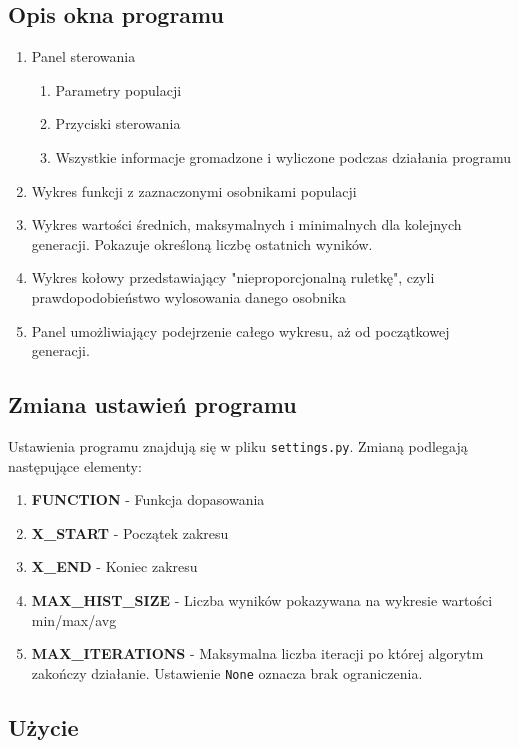 \documentclass[a4paper,11pt]{article}
\begin{document}
		\subsection{Opis okna programu}
			\begin{enumerate}
				\item Panel sterowania
				\begin{enumerate}
					\item Parametry populacji
					\item Przyciski sterowania
					\item Wszystkie informacje gromadzone i wyliczone podczas działania programu
				\end{enumerate}
				\item Wykres funkcji z zaznaczonymi osobnikami populacji
				\item Wykres wartości średnich, maksymalnych i minimalnych dla kolejnych generacji. Pokazuje określoną liczbę ostatnich wyników. 
				\item Wykres kołowy przedstawiający "nieproporcjonalną ruletkę", czyli prawdopodobieństwo wylosowania danego osobnika
				\item Panel umożliwiający podejrzenie całego wykresu, aż od początkowej generacji.
			\end{enumerate}
		
		\subsection{Zmiana ustawień programu}
			Ustawienia programu znajdują się w pliku \texttt{settings.py}. Zmianą podlegają następujące elementy:
			\begin{enumerate}
				\item \textbf{FUNCTION} - Funkcja dopasowania
				\item \textbf{X\_START} - Początek zakresu
				\item \textbf{X\_END} - Koniec zakresu
				\item \textbf{MAX\_HIST\_SIZE} - Liczba wyników pokazywana na wykresie wartości min/max/avg
				\item \textbf{MAX\_ITERATIONS} - Maksymalna liczba iteracji po której algorytm zakończy działanie. Ustawienie \texttt{None} oznacza brak ograniczenia.
			\end{enumerate}
	
		\subsection{Użycie}
\end{document}
